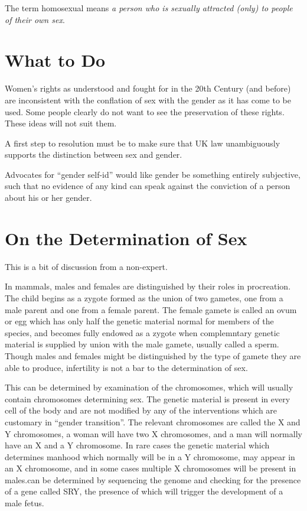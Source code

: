 \documentclass[10pt,titlepage]{article}
\begin{document}
The term homosexual means \emph{a person who is sexually attracted (only) to people of their own sex}.

\section{What to Do}

Women's rights as understood and fought for in the 20th Century (and before) are inconsistent with the conflation of sex with the gender as it has come to be used.
Some people clearly do not want to see the preservation of these rights.
These ideas will not suit them.

A first step to resolution must be to make sure that UK law unambiguously supports the distinction between sex and gender.

Advocates for ``gender self-id'' would like gender be something entirely subjective, such that no evidence of any kind can speak against the conviction of a person about his or her gender.


\appendix
\section{On the Determination of Sex}

This is a bit of discussion from a non-expert.

In mammals, males and females are distinguished by their roles in procreation.
The child begins as a zygote formed as the union of two gametes, one from a male parent and one from a female parent.
The female gamete is called an ovum or egg which has only half the genetic material normal for members of the species, and becomes fully endowed as a zygote when complemntary genetic material is supplied by union with the male gamete, usually called a sperm.
Though males and females might be distinguished by the type of gamete they are able to produce, infertility is not a bar to the determination of sex.

This can be determined by examination of the chromosomes, which will usually contain chromosomes determining sex.
The genetic material is present in every cell of the body and are not modified by any of the interventions which are customary in ``gender transition''.
The relevant chromosomes are called the X and Y chromosomes, a woman will have two X chromosomes, and a man will normally have an X and a Y chromosome.
In rare cases the genetic material which determines manhood which normally will be in a Y chromosome, may appear in an X chromosome, and in some cases multiple X chromosomes will be present in males.can be determined by sequencing the genome and checking for the presence of a gene called SRY, the presence of which will trigger the development of a male fetus.
\end{document}
